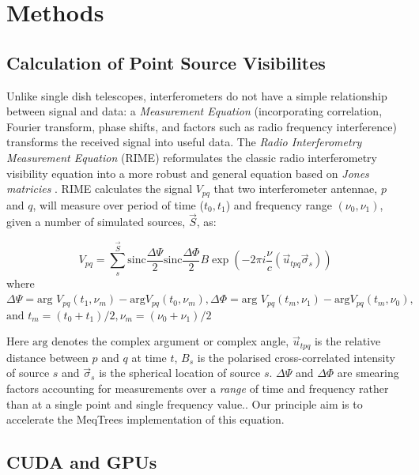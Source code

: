 \section{Methods}
\subsection{Calculation of Point Source Visibilites}
\label{sec:meqtrees}

Unlike single dish telescopes, interferometers do not have a simple relationship between signal and data: a \emph{Measurement Equation} (incorporating correlation, Fourier transform, phase shifts, and factors such as radio frequency interference) transforms the received signal into useful data. The \emph{Radio Interferometry Measurement Equation} (RIME) reformulates the classic radio interferometry visibility equation into a more robust and general equation based on \emph{Jones matricies} \citep{Smirnov2011}. RIME calculates the signal $V_{pq}$ that two interferometer antennae, $p$ and $q$, will measure over period of time ($t_0, t_1$)  and  frequency range $(\nu_0, \nu_1)$, given a number of simulated sources, $\vec{S}$, as:

\begin{equation}
V_{pq} = \sum_s^{\vec{S}}
\mbox{sinc}\frac{\Delta\Psi}{2}\mbox{sinc}\frac{\Delta\Phi}{2}
B\exp\left({-2\pi i\frac{\nu}{c}(\vec{u}_{tpq}\vec\sigma_s)}\right)
\label{eq:RIME}
\end{equation}
where
$\Delta\Psi = \mbox{arg }V_{pq}(t_1,\nu_m) - \mbox{arg
}V_{pq}(t_0,\nu_m), 
\Delta\Phi = \mbox{arg }V_{pq}(t_m,\nu_1) - \mbox{arg
}V_{pq}(t_m,\nu_0),$
$\mbox{and } t_m = (t_0 + t_1)/2, \nu_m = (\nu_0 + \nu_1)/2 $

Here $\mbox{arg}$ denotes the complex argument or complex angle, $\vec{u}_{tpq}$ is the relative distance between $p$ and $q$ at time $t$, $B_s$ is the polarised cross-correlated intensity of source $s$ and $\vec\sigma_s$ is the spherical location of source $s$. $\Delta\Psi$ and $\Delta\Phi$ are smearing factors accounting for measurements over a \emph{range} of time and frequency rather than at a single point and single frequency value.\citep{Smirnov2011, Taylor1999}. Our principle aim is to accelerate the MeqTrees implementation of this equation.



\subsection{CUDA and GPUs}

